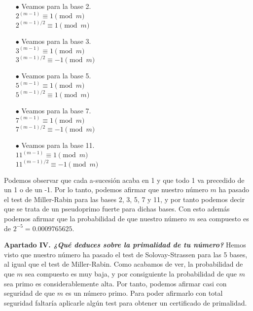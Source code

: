\documentclass[fleqn]{article}
\begin{document}
    \begin{enumerate}
        \item[$\bullet$] Veamos para la base 2.\\
                        $2^{(m-1)} \equiv 1 \pmod{m}$\\
                        $2^{(m-1)/2} \equiv 1 \pmod{m}$\\
        \item[$\bullet$] Veamos para la base 3.\\
                        $3^{(m-1)} \equiv 1 \pmod{m}$\\
                        $3^{(m-1)/2} \equiv -1 \pmod{m}$\\
        \item[$\bullet$] Veamos para la base 5.\\
                        $5^{(m-1)} \equiv 1 \pmod{m}$\\
                        $5^{(m-1)/2} \equiv 1 \pmod{m}$\\         
        \item[$\bullet$] Veamos para la base 7.\\
                        $7^{(m-1)} \equiv 1 \pmod{m}$\\
                        $7^{(m-1)/2} \equiv -1 \pmod{m}$\\   
        \item[$\bullet$] Veamos para la base 11.\\
                        $11^{(m-1)} \equiv 1 \pmod{m}$\\
                        $11^{(m-1)/2} \equiv -1 \pmod{m}$\\  
    \end{enumerate}

    Podemos observar que cada a-sucesión acaba en 1 y que todo 1 va precedido de un 1 o de un -1. Por lo tanto, podemos afirmar
    que nuestro número $m$ ha pasado el test de Miller-Rabin para las bases 2, 3, 5, 7 y 11, y por tanto podemos decir que se trata
    de un pseudoprimo fuerte para dichas bases. Con esto además podemos afirmar que la probabilidad de que nuestro número $m$ sea 
    compuesto es de $2^{-5} = 0.0009765625$.

    \newpage
    \textbf{Apartado IV. \textit{¿Qué deduces sobre la primalidad de tu número?}}
    Hemos visto que nuestro número ha pasado el test de Solovay-Strassen para las 5 bases, al igual que el test de Miller-Rabin.
    Como acabamos de ver, la probabilidad de que $m$ sea compuesto es muy baja, y por consiguiente la probabilidad de que $m$ sea
    primo es considerablemente alta. Por tanto, podemos afirmar casi con seguridad de que $m$ es un número primo. Para poder afirmarlo
    con total seguridad faltaría aplicarle algún test para obtener un certificado de primalidad.
\end{document}

